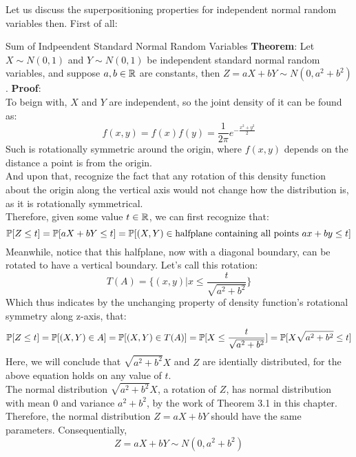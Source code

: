 Let us discuss the superpositioning properties for independent normal random variables then. First of all:
\begin{ln-theorem}{Sum of Indpeendent Standard Normal Random Variables}{}
    \textbf{Theorem}: Let $X \sim N(0, 1)$ and $Y \sim N(0, 1)$ be independent standard normal random variables, and suppose $a, b \in \R$ are constants, then $Z = aX + bY \sim N(0, a^2 + b^2)$.
    \tcblower
    \textbf{Proof}: \\
    To beign with, $X$ and $Y$ are independent, so the joint density of it can be found as:
    \[
        f(x, y) = f(x)f(y) = \frac{1}{2\pi}e^{-\frac{x^2 + y^2}{2}}
    \]
    Such is rotationally symmetric around the origin, where $f(x, y)$ depends on the distance a point is from the origin. \\
    And upon that, recognize the fact that any rotation of this density function about the origin along the vertical axis would not change how the distribution is, as it is rotationally symmetrical. \\
    Therefore, given some value $t \in \R$, we can first recognize that:
    \[\P[Z \leq t] = \P[aX + bY \leq t] = \P[(X, Y) \in \text{halfplane containing all points $ax + by \leq t$}]\]
    Meanwhile, notice that this halfplane, now with a diagonal boundary, can be rotated to have a vertical boundary. Let's call this rotation:
    \[T(A) = \{(x, y) | x \leq \frac{t}{\sqrt{a^2 + b^2}}\}\]
    Which thus indicates by the unchanging property of density function's rotational symmetry along z-axis, that:
    \[
        \P[Z \leq t] = \P[(X, Y) \in A] = \P[(X, Y) \in T(A)] = \P[X \leq \frac{t}{\sqrt{a^2 + b^2}}] = \P[X\sqrt{a^2 + b^2} \leq t]
    \]
    Here, we will conclude that $\sqrt{a^2 + b^2}X$ and $Z$ are identially distributed, for the above equation holds on any value of $t$. \\
    The normal distribution $\sqrt{a^2 + b^2}X$, a rotation of $Z$, has normal distribution with mean $0$ and variance $a^2 + b^2$, by the work of Theorem 3.1 in this chapter. \\
    Therefore, the normal distribution $Z = aX + bY$ should have the same parameters.
    Consequentially, 
    \[Z = aX + bY \sim N(0, a^2 + b^2)\]
\end{ln-theorem}

